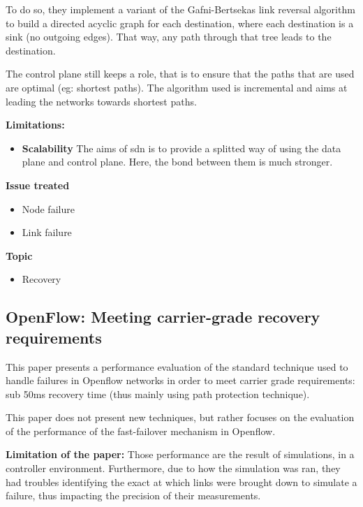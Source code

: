 \documentclass[compsoc]{IEEEtran}
\begin{document}
To do so, they implement a variant of the Gafni-Bertsekas link reversal algorithm to build a directed acyclic graph for each destination, where each destination is a sink (no outgoing edges). That way, any path through that tree leads to the destination.

The control plane still keeps a role, that is to ensure that the paths that are used are optimal (eg: shortest paths). The algorithm used is incremental and aims at leading the networks towards shortest paths.

\textbf{Limitations:}
\begin{itemize}
	\item \textbf{Scalability} The aims of sdn is to provide a splitted way of using the data plane and control plane. Here, the bond between them is much stronger.
\end{itemize}

\textbf{Issue treated}
\begin{itemize}
	\item Node failure
	\item Link failure
\end{itemize}

\textbf{Topic}
\begin{itemize}
	\item Recovery
\end{itemize}

\subsection{OpenFlow: Meeting carrier-grade recovery requirements \cite{Sharma:2013:OMC:2445634.2445903}}
This paper presents a performance evaluation of the standard technique used to handle failures in Openflow networks in order to meet carrier grade requirements: sub 50ms recovery time (thus mainly using path protection technique).

This paper does not present new techniques, but rather focuses on the evaluation of the performance of the fast-failover mechanism in Openflow. 

\textbf{Limitation of the paper:}
Those performance are the result of simulations, in a controller environment. Furthermore, due to how the simulation was ran, they had troubles identifying the exact at which links were brought down to simulate a failure, thus impacting the precision of their measurements.
\end{document}
